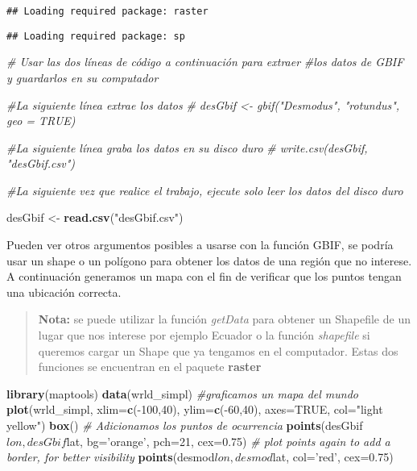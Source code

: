 \documentclass[]{article}
\newenvironment{Shaded}{\begin{snugshade}}{\end{snugshade}}
\newcommand{\KeywordTok}[1]{\textcolor[rgb]{0.13,0.29,0.53}{\textbf{{#1}}}}
\newcommand{\DataTypeTok}[1]{\textcolor[rgb]{0.13,0.29,0.53}{{#1}}}
\newcommand{\DecValTok}[1]{\textcolor[rgb]{0.00,0.00,0.81}{{#1}}}
\newcommand{\FloatTok}[1]{\textcolor[rgb]{0.00,0.00,0.81}{{#1}}}
\newcommand{\StringTok}[1]{\textcolor[rgb]{0.31,0.60,0.02}{{#1}}}
\newcommand{\CommentTok}[1]{\textcolor[rgb]{0.56,0.35,0.01}{\textit{{#1}}}}
\newcommand{\OtherTok}[1]{\textcolor[rgb]{0.56,0.35,0.01}{{#1}}}
\newcommand{\NormalTok}[1]{{#1}}
\begin{document}
\begin{verbatim}
## Loading required package: raster
\end{verbatim}

\begin{verbatim}
## Loading required package: sp
\end{verbatim}

\begin{Shaded}
\begin{Highlighting}[]
\CommentTok{# Usar las dos líneas de código a continuación para extraer }
\CommentTok{#los datos de GBIF y guardarlos en su computador}

\CommentTok{#La siguiente línea extrae los datos }
\CommentTok{# desGbif <- gbif("Desmodus", "rotundus", geo = TRUE) }

\CommentTok{#La siguiente línea graba los datos en su disco duro}
\CommentTok{# write.csv(desGbif, "desGbif.csv")}

\CommentTok{#La siguiente vez que realice el trabajo, ejecute solo leer los datos del disco duro}

\NormalTok{desGbif <-}\StringTok{ }\KeywordTok{read.csv}\NormalTok{(}\StringTok{"desGbif.csv"}\NormalTok{)}
\end{Highlighting}
\end{Shaded}

Pueden ver otros argumentos posibles a usarse con la función GBIF, se
podría usar un shape o un polígono para obtener los datos de una región
que no interese. A continuación generamos un mapa con el fin de
verificar que los puntos tengan una ubicación correcta.

\begin{quote}
\textbf{Nota:} se puede utilizar la función \emph{getData} para obtener
un Shapefile de un lugar que nos interese por ejemplo Ecuador o la
función \emph{shapefile} si queremos cargar un Shape que ya tengamos en
el computador. Estas dos funciones se encuentran en el paquete
\textbf{raster}
\end{quote}

\begin{Shaded}
\begin{Highlighting}[]
\KeywordTok{library}\NormalTok{(maptools)}
\KeywordTok{data}\NormalTok{(wrld_simpl)}
\CommentTok{#graficamos un mapa del mundo}
\KeywordTok{plot}\NormalTok{(wrld_simpl, }\DataTypeTok{xlim=}\KeywordTok{c}\NormalTok{(-}\DecValTok{100}\NormalTok{,}\DecValTok{40}\NormalTok{), }\DataTypeTok{ylim=}\KeywordTok{c}\NormalTok{(-}\DecValTok{60}\NormalTok{,}\DecValTok{40}\NormalTok{), }\DataTypeTok{axes=}\OtherTok{TRUE}\NormalTok{, }\DataTypeTok{col=}\StringTok{"light yellow"}\NormalTok{)}
\KeywordTok{box}\NormalTok{()}
\CommentTok{# Adicionamos los puntos de ocurrencia}
\KeywordTok{points}\NormalTok{(desGbif$lon, desGbif$lat, }\DataTypeTok{bg=}\StringTok{'orange'}\NormalTok{, }\DataTypeTok{pch=}\DecValTok{21}\NormalTok{, }\DataTypeTok{cex=}\FloatTok{0.75}\NormalTok{)}
\CommentTok{# plot points again to add a border, for better visibility}
\KeywordTok{points}\NormalTok{(desmod$lon, desmod$lat, }\DataTypeTok{col=}\StringTok{'red'}\NormalTok{, }\DataTypeTok{cex=}\FloatTok{0.75}\NormalTok{)}
\end{Highlighting}
\end{Shaded}
\end{document}

